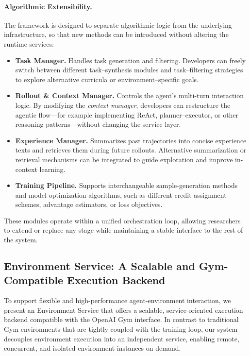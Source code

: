 \paragraph{Algorithmic Extensibility.}
The framework is designed to separate algorithmic logic from the underlying infrastructure, so that new methods can be introduced without altering the runtime services:
\begin{itemize}
\item \textbf{Task Manager.} Handles task generation and filtering.
Developers can freely switch between different task–synthesis modules and task–filtering strategies to explore alternative curricula or environment–specific goals.
\item \textbf{Rollout \& Context Manager.} Controls the agent’s multi-turn interaction logic.
By modifying the \emph{context manager}, developers can restructure the agentic flow—for example implementing ReAct, planner–executor, or other reasoning patterns—without changing the service layer.
\item \textbf{Experience Manager.} Summarizes past trajectories into concise experience texts and retrieves them during future rollouts.
Alternative summarization or retrieval mechanisms can be integrated to guide exploration and improve in-context learning.
\item \textbf{Training Pipeline.} Supports interchangeable sample-generation methods and model-optimization algorithms, such as different credit-assignment schemes, advantage estimators, or loss objectives.
\end{itemize}

These modules operate within a unified orchestration loop, allowing researchers to extend or replace any stage while maintaining a stable interface to the rest of the system.




\subsection{Environment Service: A Scalable and Gym-Compatible Execution Backend}\label{sec:env_service}

To support flexible and high-performance agent-environment interaction, we present an Environment Service that offers a scalable, service-oriented execution backend compatible with the OpenAI Gym interface. In contrast to traditional Gym environments that are tightly coupled with the training loop, our system decouples environment execution into an independent service, enabling remote, concurrent, and isolated environment instances on demand.

